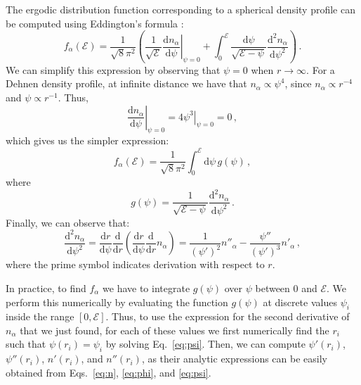 \documentclass[desactivate]{aa}
\begin{document}
\begin{appendix}
    The ergodic distribution function corresponding to a spherical density profile can be computed using Eddington's formula \citep{1916MNRAS..76..572E, 2013degn.book.....M}:
    \begin{equation}
        f_\alpha(\mathcal{E}) = \frac{1}{\sqrt{8}\pi^2} \left(\frac{1}{\sqrt{\mathcal{E}}} \left.\frac{\mathrm{d}n_\alpha}{\mathrm{d}\psi}\right\rvert_{\psi = 0} + \int^\mathcal{E}_0 \frac{\mathrm{d}\psi}{\sqrt{\mathcal{E}-\psi}}\frac{\mathrm{d}^2 n_\alpha}{\mathrm{d}\psi^2}\right) \, .
    \end{equation}
    We can simplify this expression by observing that $\psi = 0$ when $r \to \infty$. For a Dehnen density profile, at infinite distance we have that $n_\alpha \propto \psi^4$, since $n_\alpha \propto r^{-4}$ and $\psi \propto r^{-1}$. Thus,
    \begin{equation}
        \left.\frac{\mathrm{d}n_\alpha}{\mathrm{d}\psi}\right\rvert_{\psi=0} = \left.4 \psi^3\right\rvert_{\psi=0} = 0 \, ,
    \end{equation}
    which gives us the simpler expression:
    \begin{equation}
        f_\alpha(\mathcal{E}) = \frac{1}{\sqrt{8}\pi^2} \int^\mathcal{E}_0 \mathrm{d}\psi \, g(\psi) \, ,
    \end{equation}
    where
    \begin{equation}
        g(\psi) = \frac{1}{\sqrt{\mathcal{E}-\psi}}\frac{\mathrm{d}^2 n_\alpha}{\mathrm{d}\psi^2} \, .
    \end{equation}
    Finally, we can observe that:
    \begin{equation}
        \frac{\mathrm{d}^2 n_\alpha}{\mathrm{d}\psi^2} = \frac{\mathrm{d}r}{\mathrm{d}\psi} \frac{\mathrm{d}}{\mathrm{d}r} \left(\frac{\mathrm{d}r}{\mathrm{d}\psi} \frac{\mathrm{d}}{\mathrm{d}r} n_\alpha\right) = \frac{1}{\left(\psi '\right)^2} n''_\alpha-\frac{\psi''}{\left(\psi'\right)^3}n'_\alpha \, ,
    \end{equation}
    where the prime symbol indicates derivation with respect to $r$.

    In practice, to find $f_\alpha$ we have to integrate $g(\psi)$ over $\psi$ between $0$ and $\mathcal{E}$. We perform this numerically by evaluating the function $g(\psi)$ at discrete values $\psi_i$ inside the range $[0, \mathcal{E}]$. Thus, to use the expression for the second derivative of $n_\alpha$ that we just found, for each of these values we first numerically find the $r_i$ such that $\psi(r_i) = \psi_i$ by solving Eq.\ \eqref{eq:psi}. Then, we can compute $\psi'(r_i)$, $\psi''(r_i)$, $n'(r_i)$, and $n''(r_i)$, as their analytic expressions can be easily obtained from Eqs.\ \eqref{eq:n}, \eqref{eq:phi}, and \eqref{eq:psi}.


\end{appendix}
\end{document}
